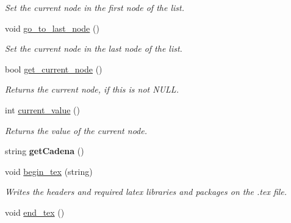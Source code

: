 \begin{DoxyCompactItemize}
\begin{DoxyCompactList}\small\item\em Set the current node in the first node of the list. \end{DoxyCompactList}\item 
\hypertarget{classlist_a3d9c0dd74589893d2e8337f6b2fa78ac}{void \hyperlink{classlist_a3d9c0dd74589893d2e8337f6b2fa78ac}{go\-\_\-to\-\_\-last\-\_\-node} ()}\label{classlist_a3d9c0dd74589893d2e8337f6b2fa78ac}

\begin{DoxyCompactList}\small\item\em Set the current node in the last node of the list. \end{DoxyCompactList}\item 
\hypertarget{classlist_af3be16d99b45856c9222dec685628122}{bool \hyperlink{classlist_af3be16d99b45856c9222dec685628122}{get\-\_\-current\-\_\-node} ()}\label{classlist_af3be16d99b45856c9222dec685628122}

\begin{DoxyCompactList}\small\item\em Returns the current node, if this is not N\-U\-L\-L. \end{DoxyCompactList}\item 
\hypertarget{classlist_a4a401135cd9300328664b4295f8bcbb1}{int \hyperlink{classlist_a4a401135cd9300328664b4295f8bcbb1}{current\-\_\-value} ()}\label{classlist_a4a401135cd9300328664b4295f8bcbb1}

\begin{DoxyCompactList}\small\item\em Returns the value of the current node. \end{DoxyCompactList}\item 
\hypertarget{classlist_af9c57f43f632e0c885c2393dc375ccf9}{string {\bfseries get\-Cadena} ()}\label{classlist_af9c57f43f632e0c885c2393dc375ccf9}

\item 
\hypertarget{classlist_a66002d493740d5c50137c428597b4f70}{void \hyperlink{classlist_a66002d493740d5c50137c428597b4f70}{begin\-\_\-tex} (string)}\label{classlist_a66002d493740d5c50137c428597b4f70}

\begin{DoxyCompactList}\small\item\em Writes the headers and required latex libraries and packages on the .tex file. \end{DoxyCompactList}\item 
\hypertarget{classlist_ad0581363cabe43d9524e27321bf19cc0}{void \hyperlink{classlist_ad0581363cabe43d9524e27321bf19cc0}{end\-\_\-tex} ()}\label{classlist_ad0581363cabe43d9524e27321bf19cc0}


\end{DoxyCompactItemize}
